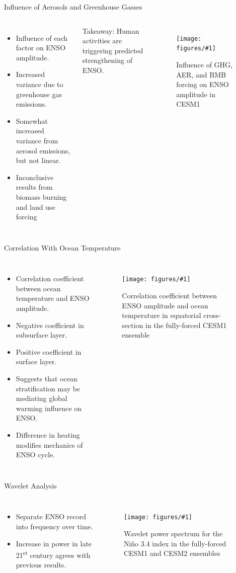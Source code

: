 \documentclass{beamer}
\newcommand{\myfig}[3]{
  \begin{figure}
    \centering
    \texttt{[image: figures/\#1]}
    \caption{#2}
    \label{fig:#3}
  \end{figure}
}
\begin{document}
\begin{frame}{Influence of Aerosols and Greenhouse Gasses}
  \begin{columns}
    \begin{itemize}
    \item Influence of each factor on ENSO amplitude.
    \item Increased variance due to greenhouse gas emissions.
    \item Somewhat increased variance from aerosol emissions, but not linear.
    \item Inconclusive results from biomass burning and land use forcing
    \end{itemize}
    \alert{Takeaway:} Human activities are triggering predicted strengthening of ENSO.
    \myfig{cesm1_sf.pdf}{Influence of GHG, AER, and BMB forcing on ENSO amplitude in CESM1}{cesm1_sf}
  \end{columns}
\end{frame}

\begin{frame}{Correlation With Ocean Temperature}
  \begin{columns}
    \begin{itemize}
    \item Correlation coefficient between ocean temperature and ENSO amplitude.
    \item Negative coefficient in subsurface layer.
    \item Positive coefficient in surface layer.
    \item Suggests that ocean stratification may be mediating global warming influence on ENSO.
    \item Difference in heating modifies mechanics of ENSO cycle.
    \end{itemize}
    \myfig{tempdt.pdf}{Correlation coefficient between ENSO amplitude and ocean temperature in equatorial cross-section in the fully-forced CESM1 ensemble}{tempdt}
  \end{columns}
\end{frame}

\begin{frame}{Wavelet Analysis}
  \begin{columns}
    \begin{itemize}
    \item Separate ENSO record into frequency over time.
    \item Increase in power in late 21\textsuperscript{st} century agrees with previous results.
    \end{itemize}
    \myfig{wavelet2.pdf}{Wavelet power spectrum for the Niño 3.4 index in the fully-forced CESM1 and CESM2 ensembles}{wavelet2}
  \end{columns}
\end{frame}
\end{document}
